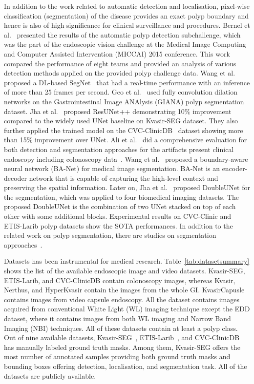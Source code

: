 \documentclass[journal]{IEEEtran}
\begin{document}
In addition to the work related to automatic detection and localisation, pixel-wise classification (segmentation) of the disease provides an exact polyp boundary and hence is also of high significance for clinical surveillance and procedures. 
Bernel et al.~\cite{bernal2017comparative} presented the results of the automatic polyp detection subchallenge, which was the part of the endoscopic vision challenge at the Medical Image Computing and Computer Assisted Intervention (MICCAI) 2015 conference. This work compared the performance of eight teams and provided an analysis of various detection methods applied on the provided polyp challenge data. Wang et al.~\cite{wang2018development} proposed a \ac{DL}-based SegNet~\cite{badrinarayanan2017segnet} that had a real-time performance with an inference of more than 25 frames per second. Geo et al.~\cite{guo2019giana} used fully convolution dilation networks on the Gastrointestinal Image ANAlysis (GIANA) polyp segmentation dataset. Jha et al.~\cite{jha2019resunet++} proposed ResUNet++ demonstrating 10\% improvement compared to the widely used UNet baseline on Kvasir-SEG dataset. They also further applied the trained model on the CVC-ClinicDB~\cite{bernal2015wm} dataset showing more than 15\% improvement over UNet. Ali et al.~\cite{ali2020objective} did a comprehensive evaluation for both detection and segmentation approaches for the artifacts present clinical endoscopy including colonoscopy data~\cite{ali2019endoscopy}. Wang et al.~\cite{wang2020boundary} proposed a boundary-aware neural network (BA-Net) for medical image segmentation. BA-Net is an encoder-decoder network that is capable of capturing the high-level context and preserving the spatial information. Later on, Jha et al.~\cite{jha2020doubleu} proposed DoubleUNet for the segmentation, which was applied to four biomedical imaging datasets. The proposed DoubleUNet is the combination of two UNet stacked on top of each other with some additional blocks. Experimental results on CVC-Clinic and ETIS-Larib polyp datasets show the \ac{SOTA} performances. In addition to the related work on polyp segmentation, there are studies on segmentation approaches~\cite{minaee2020image,baldeon2020adaresu,saeedizadeh2020covid,meng2020cnn}. 


Datasets has been instrumental for medical research.  Table~\ref{tab:datasetsummary} shows the list of the available endoscopic image and video datasets. Kvasir-SEG, ETIS-Larib, and CVC-ClinicDB contain colonoscopy images, whereas Kvasir, Nerthus, and HyperKvasir contain the images from the whole \ac{GI}. KvasirCapusle contains images from video capsule endoscopy. All the dataset contains images acquired from conventional White Light (WL) imaging technique except the EDD dataset, where it contains images from both WL imaging and Narrow Band Imaging (NBI) techniques. All of these datasets contain at least a polyp class. Out of nine available datasets, Kvasir-SEG~\cite{jha2020kvasir}, ETIS-Larib~\cite{silva2014toward}, and CVC-ClinicDB~\cite{bernal2015wm} has manually labeled ground truth masks. Among them, Kvasir-SEG offers the most number of annotated samples providing both ground truth masks and bounding boxes offering detection, localisation, and segmentation task. All of the datasets are publicly available. 
\end{document}
